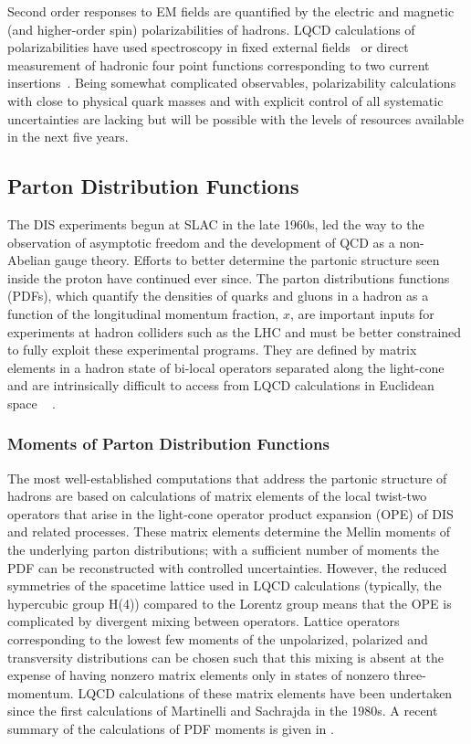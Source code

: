 Second order responses to EM fields are quantified by the electric and magnetic (and higher-order spin) polarizabilities of hadrons. LQCD calculations of polarizabilities have used spectroscopy in fixed external fields~\cite{Detmold:2006vu,Detmold:2009dx,Detmold:2010ts,Freeman:2014kka,Lujan:2014kia,Chang:2015qxa,Lujan:2016ffj,Shanahan:2017bgi,Tiburzi:2017iux} or direct measurement of hadronic four point functions corresponding to two current insertions~\cite{Engelhardt:2007ub}. Being somewhat complicated observables, polarizability calculations with close to physical quark masses and with explicit control of all systematic uncertainties are lacking but will be possible with the levels of resources available in the next five years.

\subsection{Parton Distribution Functions}

The DIS experiments begun at SLAC in the late 1960s, led the way to the observation of asymptotic freedom and the development of QCD as a non-Abelian gauge theory. Efforts to better determine the partonic structure seen inside the proton have continued ever since. The parton distributions functions (PDFs), which quantify the densities of quarks and gluons in a hadron as a function of the longitudinal momentum fraction, $x$, are important inputs for experiments at hadron colliders such as the LHC and must be better constrained to fully exploit these experimental programs.
They  are defined by matrix elements in a hadron state of bi-local operators separated along the light-cone and are intrinsically difficult to access from LQCD calculations in Euclidean space ~\cite{Collins:1981uw,Curci:1980uw,Baulieu:1979mr,Collins:1989gx} .


\subsubsection{Moments of Parton Distribution Functions}

The most well-established computations that address the partonic structure of hadrons are based on calculations of matrix elements of the local twist-two operators that arise in the light-cone operator product expansion (OPE) of DIS and related processes. These matrix elements determine the Mellin moments of the underlying parton distributions; with  a sufficient number of moments the PDF can be reconstructed with controlled uncertainties. However, the reduced symmetries of the spacetime lattice used in LQCD calculations (typically, the hypercubic group H(4)) compared to the Lorentz group means that the OPE is complicated by divergent mixing between operators.
Lattice operators corresponding to the lowest few moments of the unpolarized, polarized and transversity distributions can be chosen such that this mixing is absent at the expense of having nonzero matrix elements only in states of nonzero three-momentum. LQCD calculations of these matrix elements have been undertaken since the first calculations of Martinelli and Sachrajda \cite{Dawson:1997ic} in the 1980s. A recent summary of the calculations of PDF moments is given in \cite{Lin:2017snn}.
	
